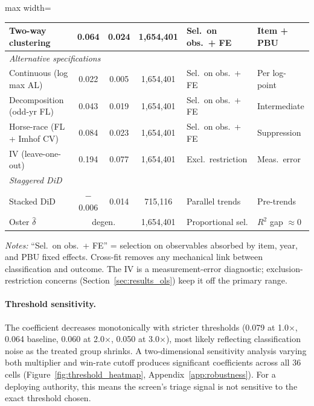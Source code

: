 \begin{table}[htbp]
\begin{adjustbox}{max width=\textwidth}
\begin{tabular}{lcccp{3.2cm}l}
Two-way clustering & 0.064 & 0.024 & 1{,}654{,}401 & Sel.\ on obs.\ + FE & Item + PBU \\
\hline
\multicolumn{6}{l}{\textit{Alternative specifications}} \\
Continuous (log max AL) & 0.022 & 0.005 & 1{,}654{,}401 & Sel.\ on obs.\ + FE & Per log-point \\
Decomposition (odd-yr FL) & 0.043 & 0.019 & 1{,}654{,}401 & Sel.\ on obs.\ + FE & Intermediate \\
Horse-race (FL + Imhof CV) & 0.084 & 0.023 & 1{,}654{,}401 & Sel.\ on obs.\ + FE & Suppression \\
IV (leave-one-out) & 0.194 & 0.077 & 1{,}654{,}401 & Excl.\ restriction & Meas.\ error \\
\hline
\multicolumn{6}{l}{\textit{Staggered DiD}} \\
Stacked DiD & $-$0.006 & 0.014 & 715{,}116 & Parallel trends & Pre-trends \\
Oster $\hat{\delta}$ & \multicolumn{2}{c}{degen.} & 1{,}654{,}401 & Proportional sel. & $R^2$ gap $\approx 0$ \\
\hline\hline
\end{tabular}
\end{adjustbox}
\begin{tablenotes}
\footnotesize
\item \textit{Notes:} ``Sel.\ on obs.\ + FE'' = selection on observables absorbed by item, year, and PBU fixed effects. Cross-fit removes any mechanical link between classification and outcome. The IV is a measurement-error diagnostic; exclusion-restriction concerns (Section~\ref{sec:results_ols}) keep it off the primary range.
\end{tablenotes}
\end{table}


\paragraph{Threshold sensitivity.}
The coefficient decreases monotonically with stricter thresholds
(0.079 at 1.0$\times$, 0.064 baseline, 0.060 at 2.0$\times$, 0.050
at 3.0$\times$), most likely reflecting classification noise as the
treated group shrinks. A two-dimensional sensitivity analysis varying
both multiplier and win-rate cutoff produces significant coefficients
across all 36 cells
(Figure~\ref{fig:threshold_heatmap}, Appendix~\ref{app:robustness}).
For a deploying authority, this means the screen's triage signal is
not sensitive to the exact threshold chosen.

